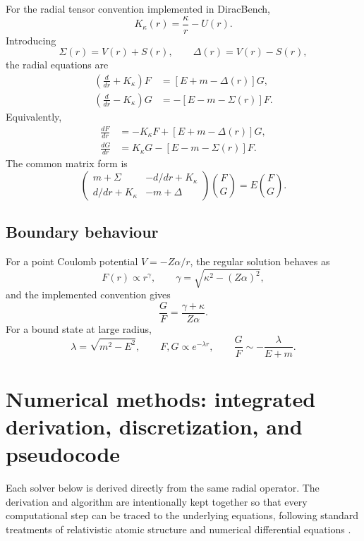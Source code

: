 \documentclass[a4paper,fleqn]{cas-dc}
\begin{document}
For the radial tensor convention implemented in DiracBench,
\begin{equation}
K_\kappa(r)=\frac{\kappa}{r}-U(r).
\end{equation}
Introducing
\begin{equation}
\Sigma(r)=V(r)+S(r),
\qquad
\Delta(r)=V(r)-S(r),
\end{equation}
the radial equations are
\begin{align}
\left(\frac{d}{dr}+K_\kappa\right)F
&=[E+m-\Delta(r)]G,
\label{eq:radial1}\\
\left(\frac{d}{dr}-K_\kappa\right)G
&=-[E-m-\Sigma(r)]F.
\label{eq:radial2}
\end{align}
Equivalently,
\begin{align}
\frac{dF}{dr}
&=-K_\kappa F+[E+m-\Delta(r)]G,
\label{eq:firstF}\\
\frac{dG}{dr}
&=K_\kappa G-[E-m-\Sigma(r)]F.
\label{eq:firstG}
\end{align}
The common matrix form is
\begin{equation}
\begin{pmatrix}
m+\Sigma & -d/dr+K_\kappa\\
d/dr+K_\kappa & -m+\Delta
\end{pmatrix}
\binom{F}{G}
=
E\binom{F}{G}.
\label{eq:radialH}
\end{equation}

\subsection{Boundary behaviour}
For a point Coulomb potential $V=-Z\alpha/r$, the regular solution behaves as
\begin{equation}
F(r)\propto r^\gamma,
\qquad
\gamma=\sqrt{\kappa^2-(Z\alpha)^2},
\end{equation}
and the implemented convention gives
\begin{equation}
\frac{G}{F}=\frac{\gamma+\kappa}{Z\alpha}.
\end{equation}
For a bound state at large radius,
\begin{equation}
\lambda=\sqrt{m^2-E^2},
\qquad
F,G\propto e^{-\lambda r},
\qquad
\frac{G}{F}\sim-\frac{\lambda}{E+m}.
\end{equation}

\section{Numerical methods: integrated derivation, discretization, and pseudocode}
Each solver below is derived directly from the same radial operator. The derivation and algorithm are intentionally kept together so that every computational step can be traced to the underlying equations, following standard treatments of relativistic atomic structure and numerical differential equations \cite{Grant2007,Thaller1992,Hairer1993}.
\end{document}
